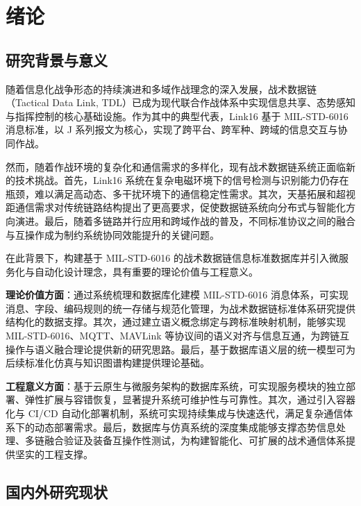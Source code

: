 \chapter{绪论}

\section{研究背景与意义}

随着信息化战争形态的持续演进和多域作战理念的深入发展，战术数据链（Tactical Data Link, TDL）已成为现代联合作战体系中实现信息共享、态势感知与指挥控制的核心基础设施\cite{NDIA_PMW101_2024,NDIA_PMW101_2022}。作为其中的典型代表，{Link16} 基于 MIL-STD-6016 消息标准，以 J 系列报文为核心，实现了跨平台、跨军种、跨域的信息交互与协同作战\cite{DOTE_2022_MIDS_LVT,NAVAIR_MIDS_Overview}。

然而，随着作战环境的复杂化和通信需求的多样化，现有战术数据链系统正面临新的技术挑战。首先，{Link16} 系统在复杂电磁环境下的信号检测与识别能力仍存在瓶颈，难以满足高动态、多干扰环境下的通信稳定性需求\cite{AviationWeek_SDA_LEO_2024,SDA_testing_OK_2023}。其次，天基拓展和超视距通信需求对传统链路结构提出了更高要求，促使数据链系统向分布式与智能化方向演进\cite{MIL_STD_6016_Active_2024,L3Harris_MIDS_JTRS_2021}。最后，随着多链路并行应用和跨域作战的普及，不同标准协议之间的融合与互操作成为制约系统协同效能提升的关键问题。

在此背景下，构建基于 MIL-STD-6016 的战术数据链信息标准数据库并引入微服务化与自动化设计理念，具有重要的理论价值与工程意义。

\textbf{理论价值方面}：通过系统梳理和数据库化建模 MIL-STD-6016 消息体系，可实现消息、字段、编码规则的统一存储与规范化管理，为战术数据链标准体系研究提供结构化的数据支撑。其次，通过建立语义概念绑定与跨标准映射机制，能够实现 MIL-STD-6016、MQTT、MAVLink 等协议间的语义对齐与信息互通，为跨链互操作与语义融合理论提供新的研究思路。最后，基于数据库语义层的统一模型可为后续标准化仿真与知识图谱构建提供理论基础。

\textbf{工程意义方面}：基于云原生与微服务架构的数据库系统，可实现服务模块的独立部署、弹性扩展与容错恢复，显著提升系统可维护性与可靠性。其次，通过引入容器化与 CI/CD 自动化部署机制，系统可实现持续集成与快速迭代，满足复杂通信体系下的动态部署需求。最后，数据库与仿真系统的深度集成能够支撑态势信息处理、多链融合验证及装备互操作性测试，为构建智能化、可扩展的战术通信体系提供坚实的工程支撑。

\section{国内外研究现状}

